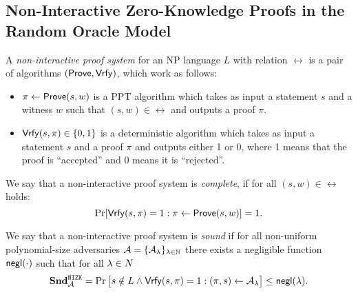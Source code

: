 \subsection{Non-Interactive Zero-Knowledge Proofs in the Random Oracle Model}

\begin{definition} 
A \emph{non-interactive proof system} for an NP language $L$ with relation $\rel$ is a pair of algorithms $(\mathsf{Prove}, \mathsf{Vrfy})$, which work as follows:
\begin{itemize}
\item $\pi \leftarrow \mathsf{Prove}(s,w)$ is a PPT algorithm which takes as input a statement $s$ and a witness $w$ such that $(s,w) \in \rel$ and outputs a proof $\pi$.
\item $\mathsf{Vrfy}(s, \pi) \in \{0,1\}$ is a deterministic algorithm which takes as input a statement $s$ and a proof $\pi$ and outputs either 1 or 0, where 1 means that the proof is ``accepted'' and 0 means it is ``rejected''.
\end{itemize}
We say that a non-interactive proof system is \emph{complete}, if for all $(s, w) \in \rel$ holds:
\[\Pr[\mathsf{Vrfy}(s,\pi)=1:\pi \leftarrow \mathsf{Prove}(s,w)] =1.\] 

We say that a non-interactive proof system is \emph{sound} if for all non-uniform polynomial-size adversaries $\mathcal{A} = \{\mathcal{A}_{\lambda}\}_{\lambda \in \mathbb{N}}$ there exists a negligible function $\mathsf{negl}(\cdot)$ such that for all $\lambda \in N$
\[
\mathbf{Snd}_{\mathcal{A}}^{\mathtt{NIZK}} = \Pr\left[
\begin{aligned}
s \notin L \land
\mathsf{Vrfy}(s, \pi) = 1
\end{aligned}
:
\begin{aligned}
(\pi, s) \leftarrow \mathcal{A}_{\lambda}
\end{aligned} \right] \leq \mathsf{negl}(\lambda).
\]

\end{definition}

